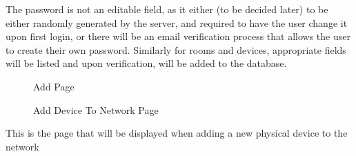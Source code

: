 \documentclass{report}
\begin{document}
The password is not an editable field, as it either (to be decided later) to be either randomly generated by the server, and required to have the user change it upon first login, 
or there will be an email verification process that allows the user to create their own password. 
Similarly for rooms and devices, appropriate fields will be listed and upon verification, will be added to the database. 
\begin{figure}[H]
\caption{Add Page}
\end{figure}
\newpage

\begin{figure}[H]
\caption{Add Device To Network Page}
\end{figure}
This is the page that will be displayed when adding a new physical device to the network
\newpage
\end{document}

